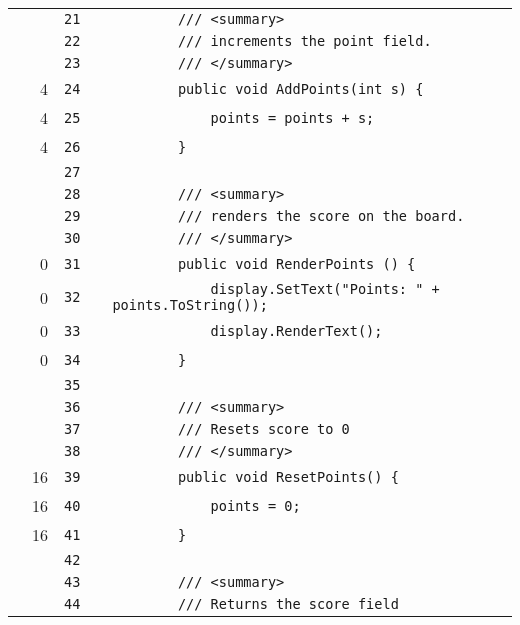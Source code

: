 \documentclass[a4paper,landscape,10pt]{article}
\begin{document}
\begin{longtable}[l]{lrrll}
\cellcolor{gray} &  & \verb~21~ & & \verb~        /// <summary>~\\
\cellcolor{gray} &  & \verb~22~ & & \verb~        /// increments the point field.~\\
\cellcolor{gray} &  & \verb~23~ & & \verb~        /// </summary>~\\
\cellcolor{green} & 4 & \verb~24~ & & \verb~        public void AddPoints(int s) {~\\
\cellcolor{green} & 4 & \verb~25~ & & \verb~            points = points + s;~\\
\cellcolor{green} & 4 & \verb~26~ & & \verb~        }~\\
\cellcolor{gray} &  & \verb~27~ & & \verb~~\\
\cellcolor{gray} &  & \verb~28~ & & \verb~        /// <summary>~\\
\cellcolor{gray} &  & \verb~29~ & & \verb~        /// renders the score on the board.~\\
\cellcolor{gray} &  & \verb~30~ & & \verb~        /// </summary>~\\
\cellcolor{red} & 0 & \verb~31~ & & \verb~        public void RenderPoints () {~\\
\cellcolor{red} & 0 & \verb~32~ & & \verb~            display.SetText("Points: " + points.ToString());~\\
\cellcolor{red} & 0 & \verb~33~ & & \verb~            display.RenderText();~\\
\cellcolor{red} & 0 & \verb~34~ & & \verb~        }~\\
\cellcolor{gray} &  & \verb~35~ & & \verb~~\\
\cellcolor{gray} &  & \verb~36~ & & \verb~        /// <summary>~\\
\cellcolor{gray} &  & \verb~37~ & & \verb~        /// Resets score to 0~\\
\cellcolor{gray} &  & \verb~38~ & & \verb~        /// </summary>~\\
\cellcolor{green} & 16 & \verb~39~ & & \verb~        public void ResetPoints() {~\\
\cellcolor{green} & 16 & \verb~40~ & & \verb~            points = 0;~\\
\cellcolor{green} & 16 & \verb~41~ & & \verb~        }~\\
\cellcolor{gray} &  & \verb~42~ & & \verb~~\\
\cellcolor{gray} &  & \verb~43~ & & \verb~        /// <summary>~\\
\cellcolor{gray} &  & \verb~44~ & & \verb~        /// Returns the score field~\\

\end{longtable}
\end{document}
